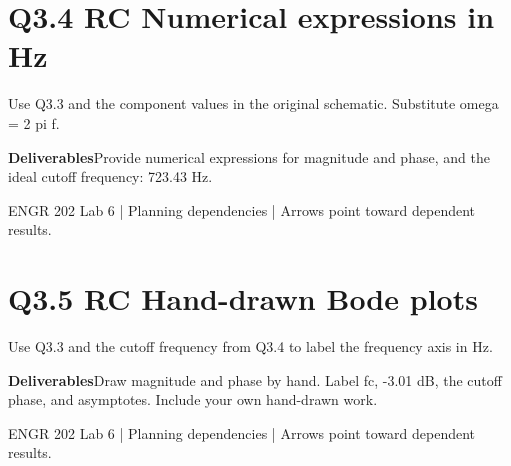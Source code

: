 \documentclass[11pt]{article}
\begin{document}
\section*{Q3.4 RC Numerical expressions in Hz}
Use Q3.3 and the component values in the original schematic. Substitute omega = 2 pi f.\par\medskip
\textbf{Deliverables}\quad Provide numerical expressions for magnitude and phase, and the ideal cutoff frequency: 723.43 Hz.\par\bigskip
\begin{center}\end{center}
\vfill\small ENGR 202 Lab 6 | Planning dependencies | Arrows point toward dependent results.
\newpage
\section*{Q3.5 RC Hand-drawn Bode plots}
Use Q3.3 and the cutoff frequency from Q3.4 to label the frequency axis in Hz.\par\medskip
\textbf{Deliverables}\quad Draw magnitude and phase by hand. Label fc, -3.01 dB, the cutoff phase, and asymptotes. Include your own hand-drawn work.\par\bigskip
\begin{center}\end{center}
\vfill\small ENGR 202 Lab 6 | Planning dependencies | Arrows point toward dependent results.
\newpage
\end{document}
